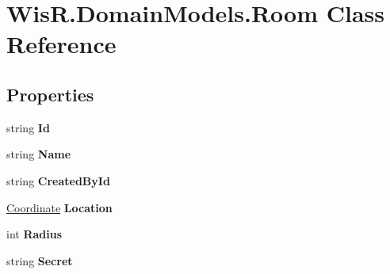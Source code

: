 \hypertarget{class_wis_r_1_1_domain_models_1_1_room}{}\section{Wis\+R.\+Domain\+Models.\+Room Class Reference}
\label{class_wis_r_1_1_domain_models_1_1_room}
\subsection*{Properties}
\begin{DoxyCompactItemize}
\item 
\hypertarget{class_wis_r_1_1_domain_models_1_1_room_a4174ec19bf10f10ca790bdfb4ff82a43}{}string {\bfseries Id}\label{class_wis_r_1_1_domain_models_1_1_room_a4174ec19bf10f10ca790bdfb4ff82a43}

\item 
\hypertarget{class_wis_r_1_1_domain_models_1_1_room_a6ef797ee63af351b3821eae2cc70b6d6}{}string {\bfseries Name}\label{class_wis_r_1_1_domain_models_1_1_room_a6ef797ee63af351b3821eae2cc70b6d6}

\item 
\hypertarget{class_wis_r_1_1_domain_models_1_1_room_a2cceeb529ffc4ef66c4c112ea783b554}{}string {\bfseries Created\+By\+Id}\label{class_wis_r_1_1_domain_models_1_1_room_a2cceeb529ffc4ef66c4c112ea783b554}

\item 
\hypertarget{class_wis_r_1_1_domain_models_1_1_room_aafefb4352620ceba5f076ff660f8ad15}{}\hyperlink{class_wis_r_1_1_domain_models_1_1_coordinate}{Coordinate} {\bfseries Location}\label{class_wis_r_1_1_domain_models_1_1_room_aafefb4352620ceba5f076ff660f8ad15}

\item 
\hypertarget{class_wis_r_1_1_domain_models_1_1_room_a0bdcc953a2826b976aed9612e64a88a8}{}int {\bfseries Radius}\label{class_wis_r_1_1_domain_models_1_1_room_a0bdcc953a2826b976aed9612e64a88a8}

\item 
\hypertarget{class_wis_r_1_1_domain_models_1_1_room_a6ac112091e8a897bd718fb4f5d2224f1}{}string {\bfseries Secret}\label{class_wis_r_1_1_domain_models_1_1_room_a6ac112091e8a897bd718fb4f5d2224f1}


\end{DoxyCompactItemize}

